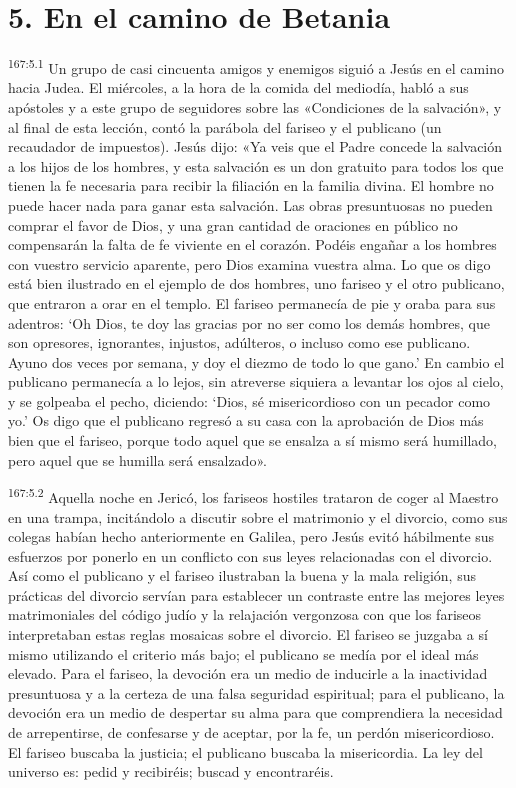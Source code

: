 \section*{5. En el camino de Betania}
\par 
\textsuperscript{167:5.1} Un grupo de casi cincuenta amigos y enemigos siguió a Jesús en el camino hacia Judea. El miércoles, a la hora de la comida del mediodía, habló a sus apóstoles y a este grupo de seguidores sobre las «Condiciones de la salvación», y al final de esta lección, contó la parábola del fariseo y el publicano (un recaudador de impuestos). Jesús dijo: «Ya veis que el Padre concede la salvación a los hijos de los hombres, y esta salvación es un don gratuito para todos los que tienen la fe necesaria para recibir la filiación en la familia divina. El hombre no puede hacer nada para ganar esta salvación. Las obras presuntuosas no pueden comprar el favor de Dios, y una gran cantidad de oraciones en público no compensarán la falta de fe viviente en el corazón. Podéis engañar a los hombres con vuestro servicio aparente, pero Dios examina vuestra alma. Lo que os digo está bien ilustrado en el ejemplo de dos hombres, uno fariseo y el otro publicano, que entraron a orar en el templo. El fariseo permanecía de pie y oraba para sus adentros: `Oh Dios, te doy las gracias por no ser como los demás hombres, que son opresores, ignorantes, injustos, adúlteros, o incluso como ese publicano. Ayuno dos veces por semana, y doy el diezmo de todo lo que gano.' En cambio el publicano permanecía a lo lejos, sin atreverse siquiera a levantar los ojos al cielo, y se golpeaba el pecho, diciendo: `Dios, sé misericordioso con un pecador como yo.' Os digo que el publicano regresó a su casa con la aprobación de Dios más bien que el fariseo, porque todo aquel que se ensalza a sí mismo será humillado, pero aquel que se humilla será ensalzado».

\par 
\textsuperscript{167:5.2} Aquella noche en Jericó, los fariseos hostiles trataron de coger al Maestro en una trampa, incitándolo a discutir sobre el matrimonio y el divorcio, como sus colegas habían hecho anteriormente en Galilea, pero Jesús evitó hábilmente sus esfuerzos por ponerlo en un conflicto con sus leyes relacionadas con el divorcio. Así como el publicano y el fariseo ilustraban la buena y la mala religión, sus prácticas del divorcio servían para establecer un contraste entre las mejores leyes matrimoniales del código judío y la relajación vergonzosa con que los fariseos interpretaban estas reglas mosaicas sobre el divorcio. El fariseo se juzgaba a sí mismo utilizando el criterio más bajo; el publicano se medía por el ideal más elevado. Para el fariseo, la devoción era un medio de inducirle a la inactividad presuntuosa y a la certeza de una falsa seguridad espiritual; para el publicano, la devoción era un medio de despertar su alma para que comprendiera la necesidad de arrepentirse, de confesarse y de aceptar, por la fe, un perdón misericordioso. El fariseo buscaba la justicia; el publicano buscaba la misericordia. La ley del universo es: pedid y recibiréis; buscad y encontraréis.

